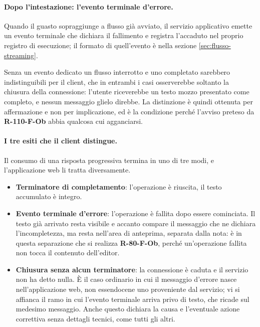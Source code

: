 \documentclass[a4paper, 10pt]{article}
\begin{document}
\paragraph{Dopo l'intestazione: l'evento terminale d'errore.}
Quando il guasto sopraggiunge a flusso già avviato, il servizio applicativo emette un evento terminale che dichiara il fallimento e registra l'accaduto nel proprio registro di esecuzione; il formato di quell'evento è nella sezione \ref{sec:flusso-streaming}.

Senza un evento dedicato un flusso interrotto e uno completato sarebbero indistinguibili per il client, che in entrambi i casi osserverebbe soltanto la chiusura della connessione: l'utente riceverebbe un testo mozzo presentato come completo, e nessun messaggio glielo direbbe. La distinzione è quindi ottenuta per affermazione e non per implicazione, ed è la condizione perché l'avviso preteso da \textbf{R-110-F-Ob} abbia qualcosa cui agganciarsi.

\paragraph{I tre esiti che il client distingue.}
Il consumo di una risposta progressiva termina in uno di tre modi, e l'applicazione web li tratta diversamente.

\begin{itemize}
    \setlength{\itemsep}{3pt}
    \item \textbf{Terminatore di completamento}: l'operazione è riuscita, il testo accumulato è integro.
    \item \textbf{Evento terminale d'errore}: l'operazione è fallita dopo essere cominciata. Il testo già arrivato resta visibile e accanto compare il messaggio che ne dichiara l'incompletezza, ma resta nell'area di anteprima, separata dalla nota: è in questa separazione che si realizza \textbf{R-80-F-Ob}, perché un'operazione fallita non tocca il contenuto dell'editor.
    \item \textbf{Chiusura senza alcun terminatore}: la connessione è caduta e il servizio non ha detto nulla. È il caso ordinario in cui il messaggio d'errore nasce nell'applicazione web, non essendocene uno proveniente dal servizio; vi si affianca il ramo in cui l'evento terminale arriva privo di testo, che ricade sul medesimo messaggio. Anche questo dichiara la causa e l'eventuale azione correttiva senza dettagli tecnici, come tutti gli altri.
\end{itemize}
\end{document}
